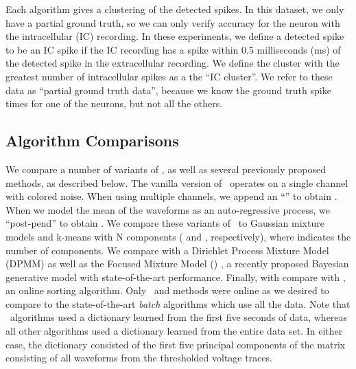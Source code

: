 Each algorithm gives a clustering of the detected spikes.  In this dataset, we only have a partial ground truth, so we can only verify accuracy for the neuron with the intracellular (IC) recording.  In these experiments, we define a detected spike to be an IC spike if the IC recording has a spike within 0.5 milliseconds (ms) of the detected spike in the extracellular recording.  We define the cluster with the greatest number of intracellular spikes as a the ``IC cluster''.   We refer to these data as ``partial ground truth data'', because we know the ground truth spike times for one of the neurons, but not all the others.  




\subsection{Algorithm Comparisons}

We compare a number of variants of \smug, as well as several previously proposed methods, as described below.  The vanilla version of \smug\ operates on a single channel with colored noise.  When using multiple channels, we append an ``'' to obtain \smug.  When we model the mean of the waveforms as an auto-regressive process, we ``post-pend'' to obtain \smug{}.  
We compare these variants of \smug\ to Gaussian mixture models and k-means with N components ( and , respectively), where  indicates the number of components.  We compare with a Dirichlet Process Mixture Model (DPMM) \cite{WoodBla2008} as well as the  Focused Mixture Model () \cite{FMM}, a recently proposed Bayesian generative model with state-of-the-art performance.  Finally, with compare with  \cite{OSORT}, an online sorting algorithm.  Only \smug\ and  methods were online as we desired to compare to the state-of-the-art \emph{batch} algorithms which use all the data. 
Note that \smug\ algorithms used a dictionary learned from the first five seconds of data, whereas all other algorithms used a dictionary learned from the entire data set.  In either case, the dictionary consisted of the first five principal components of the matrix consisting of all waveforms from the thresholded voltage traces.  

